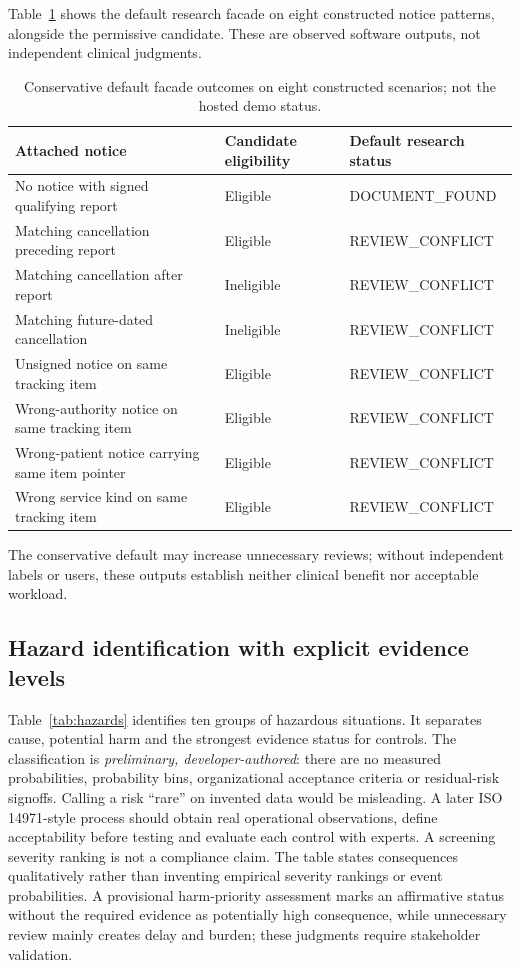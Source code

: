 \documentclass[11pt,twocolumn]{article}
\begin{document}
Table~\ref{tab:triage} shows the default research facade on eight constructed notice patterns, alongside the permissive candidate. These are observed software outputs, not independent clinical judgments.

\begin{table}[t]\centering\small\caption{Conservative default facade outcomes on eight constructed scenarios; not the hosted demo status.}\label{tab:triage}
\begin{tabular}{@{}p{}p{}p{}@{}}\toprule
Attached notice & Candidate eligibility & Default research status \\\midrule
No notice with signed qualifying report & Eligible & DOCUMENT\_FOUND \\
Matching cancellation preceding report & Eligible & REVIEW\_CONFLICT \\
Matching cancellation after report & Ineligible & REVIEW\_CONFLICT \\
Matching future-dated cancellation & Ineligible & REVIEW\_CONFLICT \\
Unsigned notice on same tracking item & Eligible & REVIEW\_CONFLICT \\
Wrong-authority notice on same tracking item & Eligible & REVIEW\_CONFLICT \\
Wrong-patient notice carrying same item pointer & Eligible & REVIEW\_CONFLICT \\
Wrong service kind on same tracking item & Eligible & REVIEW\_CONFLICT \\\bottomrule
\end{tabular}
\end{table}

The conservative default may increase unnecessary reviews; without independent labels or users, these outputs establish neither clinical benefit nor acceptable workload.

\subsection{Hazard identification with explicit evidence levels}
Table~\ref{tab:hazards} identifies ten groups of hazardous situations. It separates cause, potential harm and the strongest evidence status for controls. The classification is \emph{preliminary, developer-authored}: there are no measured probabilities, probability bins, organizational acceptance criteria or residual-risk signoffs. Calling a risk ``rare'' on invented data would be misleading. A later ISO 14971-style process should obtain real operational observations, define acceptability before testing and evaluate each control with experts. A screening severity ranking is not a compliance claim. The table states consequences qualitatively rather than inventing empirical severity rankings or event probabilities. A provisional harm-priority assessment marks an affirmative status without the required evidence as potentially high consequence, while unnecessary review mainly creates delay and burden; these judgments require stakeholder validation.
\end{document}
